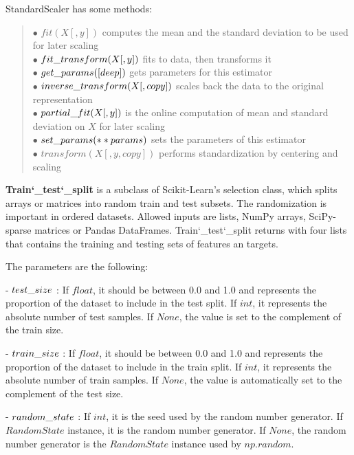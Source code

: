 \noindent StandardScaler has some methods:
\begin{verse}
	$\bullet$ $fit(X[, y])$ computes the mean and the standard deviation to be used for later scaling\\
	$\bullet$ $fit\char`_transform(X[, y])$ fits to data, then transforms it\\
	$\bullet$ $get\char`_params([deep])$ gets parameters for this estimator\\
	$\bullet$ $inverse\char`_transform(X[, copy])$ scales back the data to the original representation\\
	$\bullet$ $partial\char`_fit(X[, y])$ is the online computation of mean and standard deviation on $X$ for later scaling\\
	$\bullet$ $set\char`_params(**params)$ sets the parameters of this estimator\\
	$\bullet$ $transform(X[, y, copy])$ performs standardization by centering and scaling
\end{verse}\medskip

\textbf{Train\char`_test\char`_split} is a subclass of Scikit-Learn's selection class, which splits arrays or matrices into random train and test subsets. The randomization is important in ordered datasets. Allowed inputs are lists, NumPy arrays, SciPy-sparse matrices or Pandas DataFrames. Train\char`_test\char`_split returns with four lists that contains the training and testing sets of features an targets.\medskip

\noindent The parameters are the following:\medskip

\noindent - $test\char`_size$ : If $float$, it should be between 0.0 and 1.0 and represents the proportion of the dataset to include in the test split. If $int$, it represents the absolute number of test samples. If $None$, the value is set to the complement of the train size. \smallskip

\noindent - $train\char`_size$ : If $float$, it should be between 0.0 and 1.0 and represents the proportion of the dataset to include in the train split. If $int$, it represents the absolute number of train samples. If $None$, the value is automatically set to the complement of the test size.\smallskip

\noindent - $random\char`_state$ : If $int$, it is the seed used by the random number generator. If $RandomState$ instance, it is the random number generator. If $None$, the random number generator is the $RandomState$ instance used by $np.random$.\smallskip


